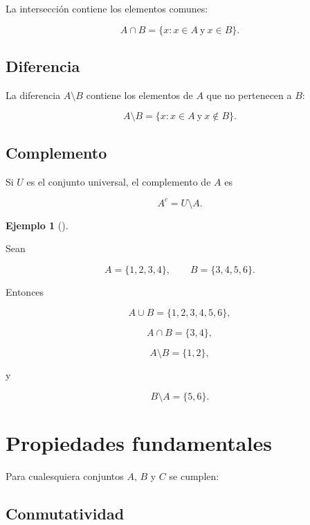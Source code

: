 \documentclass[
  spanish,
  10.5pt,
  letterpaper,
  DIV=11,
  numbers=noendperiod,
  oneside,
  open=any]{scrreprt}
\theoremstyle{definition}
\theoremstyle{definition}
\newtheorem{example}{Ejemplo}[chapter]
\theoremstyle{plain}
\theoremstyle{remark}
\begin{document}
La intersección contiene los elementos comunes:

\[
A\cap B
=
\{x:x\in A\ \text{y}\ x\in B\}.
\]

\subsection*{Diferencia}\label{diferencia}

La diferencia \(A\setminus B\) contiene los elementos de \(A\) que no
pertenecen a \(B\):

\[
A\setminus B
=
\{x:x\in A\ \text{y}\ x\notin B\}.
\]

\subsection*{Complemento}\label{complemento}

Si \(U\) es el conjunto universal, el complemento de \(A\) es

\[
A^{c}=U\setminus A.
\]

\begin{example}[]\protect\hypertarget{exm-operaciones-conjuntos}{}\label{exm-operaciones-conjuntos}

Sean

\[
A=\{1,2,3,4\},
\qquad
B=\{3,4,5,6\}.
\]

Entonces

\[
A\cup B=\{1,2,3,4,5,6\},
\]

\[
A\cap B=\{3,4\},
\]

\[
A\setminus B=\{1,2\},
\]

y

\[
B\setminus A=\{5,6\}.
\]

\end{example}

\section*{Propiedades fundamentales}\label{propiedades-fundamentales}


Para cualesquiera conjuntos \(A\), \(B\) y \(C\) se cumplen:

\subsection*{Conmutatividad}\label{conmutatividad}
\end{document}
